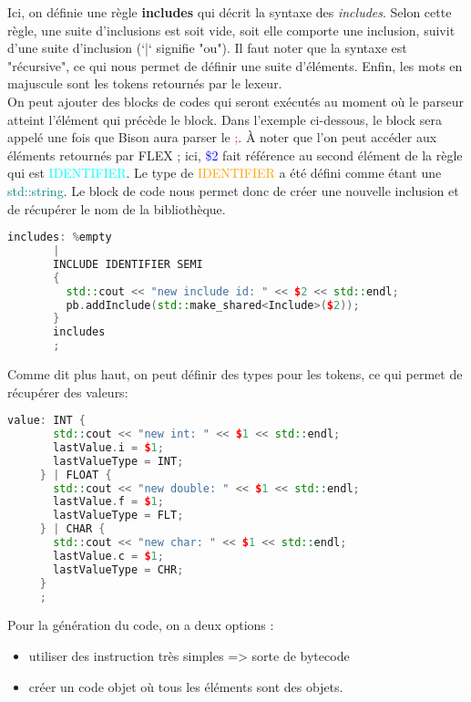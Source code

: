 \documentclass[a4paper]{article}
\begin{document}
Ici, on définie une règle \textbf{includes} qui décrit la syntaxe des \textit{includes}. Selon cette règle, une suite d'inclusions est soit vide, soit elle comporte une inclusion, suivit d'une suite d'inclusion (`|` signifie "ou"). Il faut noter que la syntaxe est "récursive", ce qui nous permet de définir une suite d'éléments.
Enfin, les mots en majuscule sont les tokens retournés par le lexeur.\\

On peut ajouter des blocks de codes qui seront exécutés au moment où le parseur
atteint l'élément qui précède le block. Dans l'exemple ci-dessous, le block sera appelé une fois que Bison aura parser le \textcolor{red}{;}. À noter que l'on peut accéder aux éléments retournés par FLEX ; ici, \textcolor{blue}{\$2} fait référence au second élément de la règle qui est \textcolor{cyan}{IDENTIFIER}. Le type de \textcolor{orange}{IDENTIFIER} a été défini comme étant une \textcolor{teal}{std::string}. Le block de code nous permet donc de créer une nouvelle inclusion et de récupérer le nom de la bibliothèque.\\

\begin{lstlisting}[language=c++]
includes: %empty
       |
       INCLUDE IDENTIFIER SEMI
       {
         std::cout << "new include id: " << $2 << std::endl;
         pb.addInclude(std::make_shared<Include>($2));
       }
       includes
       ;
\end{lstlisting}\leavevmode\newline


Comme dit plus haut, on peut définir des types pour les tokens, ce qui permet de
récupérer des valeurs:

\begin{lstlisting}[language=c++]
value: INT {
       std::cout << "new int: " << $1 << std::endl;
       lastValue.i = $1;
       lastValueType = INT;
     } | FLOAT {
       std::cout << "new double: " << $1 << std::endl;
       lastValue.f = $1;
       lastValueType = FLT;
     } | CHAR {
       std::cout << "new char: " << $1 << std::endl;
       lastValue.c = $1;
       lastValueType = CHR;
     }
     ;
\end{lstlisting}\leavevmode\newline

Pour la génération du code, on a deux options :
\begin{itemize}
\item utiliser des instruction très simples => sorte de bytecode
\item créer un code objet où tous les éléments sont des objets.
\end{itemize}\leavevmode\\
\end{document}
